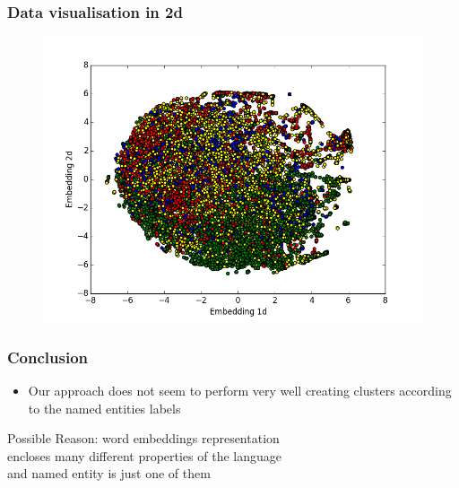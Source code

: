 \documentclass{beamer}
\begin{document}
\begin{frame}
\frametitle{Data visualisation in 2d}
\begin{figure}
\includegraphics[width=0.8\linewidth]{../REPORT/Figures_Mik/embedding2DTrue_labelsColor2.png}  
\end{figure}
\end{frame}


\begin{frame}
\frametitle{Conclusion}
\begin{itemize} 
\item Our approach does not seem to perform very well creating clusters according to the named entities labels
\end{itemize}

  \hspace{1cm} Possible Reason: word embeddings representation \\
   \hspace{1cm} encloses many different properties of the language \\
    \hspace{1cm} and named entity is just one of them
\end{frame}



 
 
 
\end{document}
